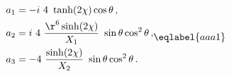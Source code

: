\begin{equation}
\begin{split}
a_1&=- i\ 4\ \tanh(2\chi) \cos\theta\,, \\
a_2&=i\ 4\ \frac{\r^6\sinh(2\chi)}{X_1}\ \sin\theta\cos^2\theta\,,\\
a_3&=-4\  \frac{\sinh(2\chi)}{X_2}\ \sin\theta\cos^2\theta\,.
\end{split}
\eqlabel{aaa1}
\end{equation}

